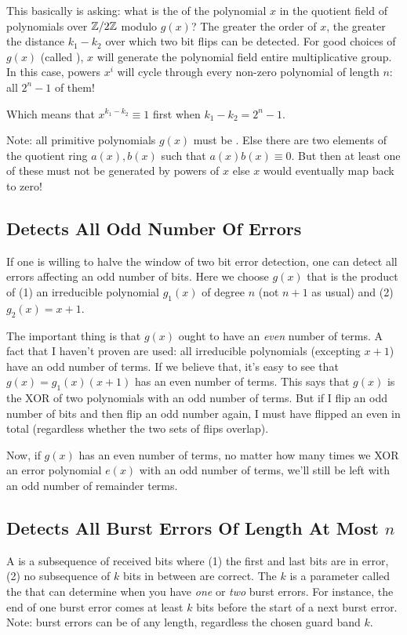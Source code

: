 \documentclass[11pt, oneside]{amsart}
\begin{document}
This basically is asking: what is the  of the polynomial
$x$ in the quotient field of polynomials over $\mathbb{Z} / 2\mathbb{Z}$ modulo $g(x)$?
The greater the order of $x$, the greater the distance $k_1 - k_2$ over
which two bit flips can be detected. For good choices of $g(x)$ (called
), $x$ will generate the polynomial field
entire multiplicative group. In this case, powers $x^i$ will cycle
through every non-zero polynomial of length $n$: all $2^n - 1$ of them!

Which means that $x^{k_1 - k_2} \equiv 1$ first when $k_1 - k_2 = 2^n -
1$.

Note: all primitive polynomials $g(x)$ must be .
Else there are two elements of the quotient ring $a(x), b(x)$ such that
$a(x)b(x) \equiv 0$. But then at least one of these must not be
generated by powers of $x$ else $x$ would eventually map back to zero!

\subsection{Detects All Odd Number Of Errors}

If one is willing to halve the window of two bit error detection, one
can detect all errors affecting an odd number of bits. Here we choose
$g(x)$ that is the product of (1) an irreducible polynomial $g_1(x)$ of
degree $n$ (not $n+1$ as usual) and (2) $g_2(x) = x + 1$.

The important thing is that $g(x)$ ought to have an \emph{even} number
of terms. A fact that I haven't proven are used: all irreducible
polynomials (excepting $x+1$) have an odd number of terms. If we believe
that, it's easy to see that $g(x) = g_1(x) (x+1)$ has an even number of
terms. This says that $g(x)$ is the XOR of two polynomials with an odd
number of terms. But if I flip an odd number of bits and then flip an
odd number again, I must have flipped an even in total (regardless
whether the two sets of flips overlap).

Now, if $g(x)$ has an even number of terms, no matter how many times we
XOR an error polynomial $e(x)$ with an odd number of terms, we'll still
be left with an odd number of remainder terms.

\subsection{Detects All Burst Errors Of Length At Most $n$}

A  is a subsequence of received bits where (1) the
first and last bits are in error, (2) no subsequence of $k$ bits in
between are correct. The $k$ is a parameter called the  that can determine when you have \emph{one} or \emph{two} burst
errors. For instance, the end of one burst error comes at least $k$ bits
before the start of a next burst error. Note: burst errors can be of any
length, regardless the chosen guard band $k$.
\end{document}
